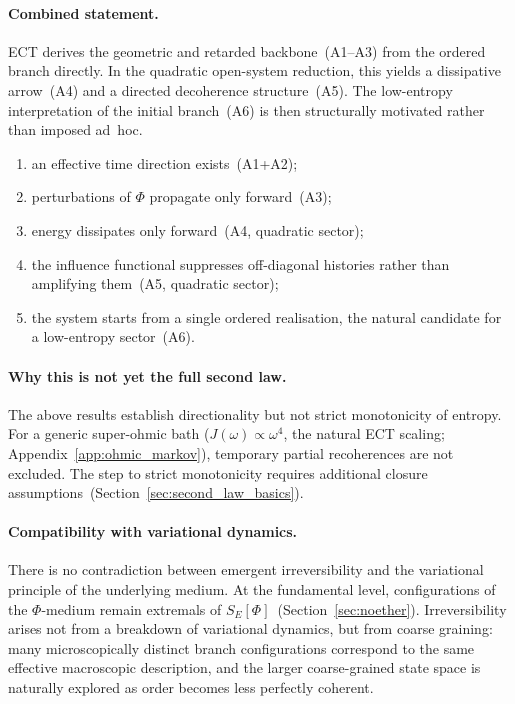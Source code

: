 \documentclass[11pt,a4paper]{article}
\numberwithin{equation}{section}
\begin{document}
\paragraph{Combined statement.}
ECT derives the geometric and retarded backbone~(A1--A3) from the
ordered branch directly.
In the quadratic open-system reduction, this yields a dissipative
arrow~(A4) and a directed decoherence structure~(A5).
The low-entropy interpretation of the initial branch~(A6) is then
structurally motivated rather than imposed ad~hoc.
\begin{enumerate}[label=(\alph*)]
  \item an effective time direction exists~(A1+A2);
  \item perturbations of $\Phi$ propagate only forward~(A3);
  \item energy dissipates only forward~(A4, quadratic sector);
  \item the influence functional suppresses off-diagonal histories
    rather than amplifying them~(A5, quadratic sector);
  \item the system starts from a single ordered realisation,
    the natural candidate for a low-entropy sector~(A6).
\end{enumerate}

\paragraph{Why this is not yet the full second law.}
The above results establish directionality but not strict monotonicity
of entropy.
For a generic super-ohmic bath ($J(\omega)\propto\omega^4$, the
natural ECT scaling; Appendix~\ref{app:ohmic_markov}),
temporary partial recoherences are not excluded.
The step to strict monotonicity requires additional closure
assumptions~(Section~\ref{sec:second_law_basics}).

\paragraph{Compatibility with variational dynamics.}
There is no contradiction between emergent irreversibility and the
variational principle of the underlying medium.
At the fundamental level, configurations of the $\Phi$-medium remain
extremals of $S_E[\Phi]$~(Section~\ref{sec:noether}).
Irreversibility arises not from a breakdown of variational dynamics, but
from coarse graining: many microscopically distinct branch configurations
correspond to the same effective macroscopic description, and the larger
coarse-grained state space is naturally explored as order becomes less
perfectly coherent.
\end{document}
